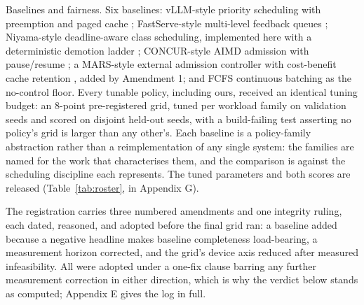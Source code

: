 Baselines and fairness. Six baselines: vLLM-style priority scheduling
with preemption and paged cache \citep{vllm2023}; FastServe-style multi-level
feedback queues \citep{wu2023fastserve}; Niyama-style deadline-aware class
scheduling, implemented here with a deterministic demotion ladder
\citep{niyama2025}; CONCUR-style AIMD admission with pause/resume
\citep{concur2026}; a MARS-style external admission controller with
cost-benefit cache retention \citep{mars2026}, added by Amendment 1; and FCFS
continuous batching as the no-control floor. Every tunable policy,
including ours, received an identical tuning budget: an 8-point
pre-registered grid, tuned per workload family on validation seeds and
scored on disjoint held-out seeds, with a build-failing test asserting
no policy's grid is larger than any other's. Each baseline is a
policy-family abstraction rather than a reimplementation of any single
system: the families are named for the work that characterises them, and
the comparison is against the scheduling discipline each represents. The
tuned parameters and both scores are released (Table~\ref{tab:roster}, in Appendix G).

The registration carries three numbered amendments and one integrity
ruling, each dated, reasoned, and adopted before the final grid ran: a
baseline added because a negative headline makes baseline completeness
load-bearing, a measurement horizon corrected, and the grid's device axis
reduced after measured infeasibility. All were adopted under a one-fix
clause barring any further measurement correction in either direction,
which is why the verdict below stands as computed; Appendix E gives the
log in full.
